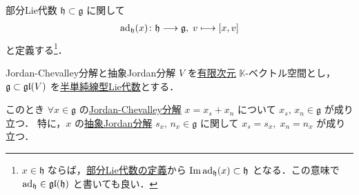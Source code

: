 \documentclass[rep_main]{subfiles}
\begin{document}
部分Lie代数 $\mathfrak{h} \subset \mathfrak{g}$ に関して
\begin{align}
	\ad_{\mathfrak{h}}(x) \colon \mathfrak{h} \lto \mathfrak{g},\; v \lmto \comm{x}{v}
\end{align}
と定義する\footnote{$x \in \mathfrak{h}$ ならば，\hyperref[def:sub-LieAlg]{部分Lie代数の定義}から $\Im \operatorname{ad}_\mathfrak{h}(x) \subset \mathfrak{h}$ となる．この意味で $\operatorname{ad}_{\mathfrak{h}} \in \mathfrak{gl}(\mathfrak{h})$ と書いても良い．}．

\begin{mytheo}[label=thm:JC]{Jordan-Chevalley分解と抽象Jordan分解}
	$V$ を\underline{有限次元} $\mathbb{K}$-ベクトル空間とし，$\mathfrak{g} \subset \mathfrak{gl}(V)$ を\hyperref[def:semisimple-LieAlg]{半単純線型Lie代数}とする．
	
	このとき $\forall x \in \mathfrak{g}$ の\hyperref[prop:Jordan-Chevalley]{Jordan-Chevalley分解} $x = x_s + x_n$ について $x_s,\, x_n \in \mathfrak{g}$ が成り立つ．
	特に，$x$ の\hyperref[def:abstruct-JC]{抽象Jordan分解} $s_x,\, n_x \in \mathfrak{g}$ に関して $x_s = s_x,\; x_n = n_x$ が成り立つ．
\end{mytheo}
\end{document}
